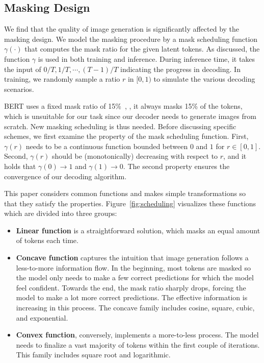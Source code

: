 \subsection{Masking Design}
\label{ssec:masking}

We find that the quality of image generation is significantly affected by the masking design. We model the masking procedure by a mask scheduling function $\gamma (\cdot)$ that computes the mask ratio for the given latent tokens. As discussed, the function $\gamma$ is used in both training and inference. During inference time, it takes the input of $0/T, 1/T, \cdots, (T-1)/T$ indicating the progress in decoding. In training, we randomly sample a ratio $r$ in $[0,1)$ to simulate the various decoding scenarios.

BERT uses a fixed mask ratio of 15\%~\cite{Devlin19bert}, \ie, it always masks 15\% of the tokens, which is unsuitable for our task since our decoder needs to generate images from scratch. New masking scheduling is thus needed. Before discussing specific schemes, we first examine the property of the mask scheduling function. First, $\gamma(r)$ needs to be a continuous function bounded between $0$ and $1$ for $r \in [0,1]$. Second, $\gamma(r)$ should be (monotonically) decreasing with respect to $r$, and it holds that $\gamma(0)\rightarrow1$ and $\gamma(1)\rightarrow0$. 
The second property ensures the convergence of our decoding algorithm.

This paper considers common functions and makes simple transformations so that they satisfy the properties. Figure~\ref{fig:scheduling} visualizes these functions which are divided into three groups:
\begin{itemize}
    \vspace{-2mm}
    \item \textbf{Linear function} is a straightforward solution, which masks an equal amount of tokens each time.
    \vspace{-2mm}
    \item \textbf{Concave function} captures the intuition that image generation follows a less-to-more information flow. In the beginning, most tokens are masked so the model only needs to make a few correct predictions for which the model feel confident. Towards the end, the mask ratio sharply drops, forcing the model to make a lot more correct predictions. The effective information is increasing in this process. The concave family includes cosine, square, cubic, and exponential.
    \vspace{-2mm}
    \item \textbf{Convex function}, conversely, implements a more-to-less process. The model needs to finalize a vast majority of tokens within the first couple of iterations. This family includes square root and logarithmic.
    
    \vspace{-2mm}
\end{itemize}

